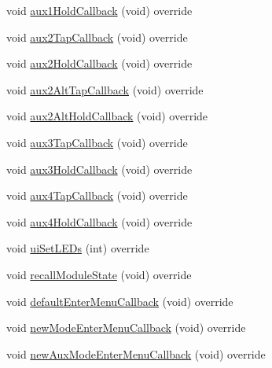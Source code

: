 \begin{DoxyCompactItemize}
\item 
void \mbox{\hyperlink{class_via_gateseq_1_1_via_gateseq_u_i_ac0a66889f6859802f3594031f81f05f3}{aux1\+Hold\+Callback}} (void) override
\item 
void \mbox{\hyperlink{class_via_gateseq_1_1_via_gateseq_u_i_a8e700657f1fe190238eca7c46541337b}{aux2\+Tap\+Callback}} (void) override
\item 
void \mbox{\hyperlink{class_via_gateseq_1_1_via_gateseq_u_i_a825cc56cdbeffd7eee887e8f189cb35d}{aux2\+Hold\+Callback}} (void) override
\item 
void \mbox{\hyperlink{class_via_gateseq_1_1_via_gateseq_u_i_a84c1f0f19956b81f81a7fba2b6581f99}{aux2\+Alt\+Tap\+Callback}} (void) override
\item 
void \mbox{\hyperlink{class_via_gateseq_1_1_via_gateseq_u_i_ada61d29fe8fd743edbb49500ee6e3d27}{aux2\+Alt\+Hold\+Callback}} (void) override
\item 
void \mbox{\hyperlink{class_via_gateseq_1_1_via_gateseq_u_i_a9bb95780740cd9fe650ba38aa3fb86a6}{aux3\+Tap\+Callback}} (void) override
\item 
void \mbox{\hyperlink{class_via_gateseq_1_1_via_gateseq_u_i_a5b18aa40706a39ed8878143d6911bc78}{aux3\+Hold\+Callback}} (void) override
\item 
void \mbox{\hyperlink{class_via_gateseq_1_1_via_gateseq_u_i_af12df5bd6d6bb9b069e8c410fcae7473}{aux4\+Tap\+Callback}} (void) override
\item 
void \mbox{\hyperlink{class_via_gateseq_1_1_via_gateseq_u_i_a98c59b4566672aeb522f6cafccd46b72}{aux4\+Hold\+Callback}} (void) override
\item 
void \mbox{\hyperlink{class_via_gateseq_1_1_via_gateseq_u_i_ab3eb51f8dcb036861e62c4456d726771}{ui\+Set\+L\+E\+Ds}} (int) override
\item 
void \mbox{\hyperlink{class_via_gateseq_1_1_via_gateseq_u_i_a4f3313685b65a93e1cd12e458dba34de}{recall\+Module\+State}} (void) override
\item 
void \mbox{\hyperlink{class_via_gateseq_1_1_via_gateseq_u_i_ad71d38b0b6b8c29e9f93e0fe6d2c40fc}{default\+Enter\+Menu\+Callback}} (void) override
\item 
void \mbox{\hyperlink{class_via_gateseq_1_1_via_gateseq_u_i_a7ced8ac998979d31b1f0a617edba8490}{new\+Mode\+Enter\+Menu\+Callback}} (void) override
\item 
void \mbox{\hyperlink{class_via_gateseq_1_1_via_gateseq_u_i_ad6fb8d3cdf019a290c82a9d42f3f83a7}{new\+Aux\+Mode\+Enter\+Menu\+Callback}} (void) override
\item 

\end{DoxyCompactItemize}
